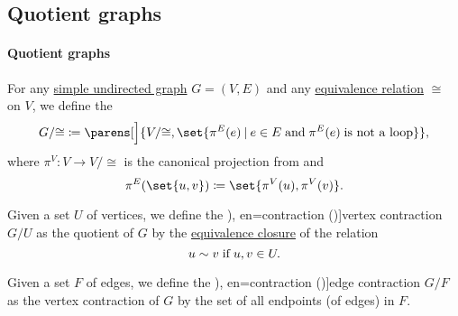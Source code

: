 \subsection{Quotient graphs}\label{subsec:quotient_graphs}

\paragraph{Quotient graphs}

\begin{definition}\label{def:quotient_graph}\mimprovised
  For any \hyperref[def:undirected_graph]{simple undirected graph} \( G = (V, E) \) and any \hyperref[def:equivalence_relation]{equivalence relation} \( {\cong} \) on \( V \), we define the 
  \begin{equation*}
    G / {\cong} \coloneqq \parens[\Big]{ V / {\cong}, \set{ \pi^E(e) \given e \in E \T{and} \pi^E(e) \T{is not a loop} } },
  \end{equation*}
  where \( \pi^V: V \to V / {\cong} \) is the canonical projection from  and
  \begin{equation*}
    \pi^E(\set{ u, v }) \coloneqq \set{ \pi^V(u), \pi^V(v) }.
  \end{equation*}

  \begin{thmenum}
     Given a set \( U \) of vertices, we define the \term[ru=отождествление вершин (\cite[22]{Емеличев1990}), en=contraction (\cite[532]{Rosen1999})]{vertex contraction} \( G / U \) as the quotient of \( G \) by the \hyperref[thm:equivalence_closure]{equivalence closure} of the relation
    \begin{equation*}
      u \sim v \T{if} u, v \in U.
    \end{equation*}

     Given a set \( F \) of edges, we define the \term[ru=стягивание ребра (\cite[21]{Емеличев1990}), en=contraction (\cite[532]{Rosen1999})]{edge contraction} \( G / F \) as the vertex contraction of \( G \) by the set of all endpoints (of edges) in \( F \).
  \end{thmenum}
\end{definition}
